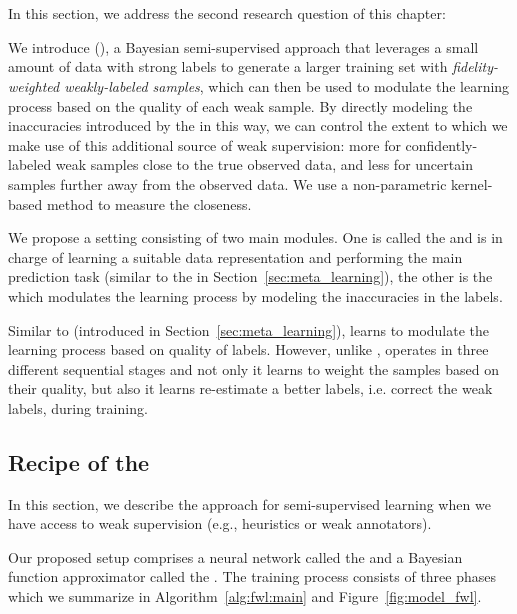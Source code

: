 \newcommand{\tfunc}{T} %
\section{\fwlfull}
\label{sec:fidelity_weighted_learning}

In this section, we address the second research question of this chapter:

We introduce \fwlfull (\fwl), a Bayesian semi-supervised approach that leverages a small amount of data with strong labels to generate a larger training set with \emph{fidelity-weighted weakly-labeled samples}, which can then be used to modulate the learning process based on the quality of each weak sample. By directly modeling the inaccuracies introduced by the \wa in this way, we can control the extent to which we make use of this additional source of weak supervision: more for confidently-labeled weak samples close to the true observed data, and less for uncertain samples further away from the observed data. We use a non-parametric kernel-based method to measure the closeness.

We propose a setting consisting of two main modules. One is called the \std and is in charge of learning a suitable data representation and performing the main prediction task (similar to the \tnet in Section~\ref{sec:meta_learning}), the other is the \tch which modulates the learning process by modeling the inaccuracies in the labels. 

Similar to \cws (introduced in Section~\ref{sec:meta_learning}), \fwl learns to modulate the learning process based on quality of labels. However, unlike \cws, \fwl operates in three different sequential stages and not only it learns to weight the samples based on their quality, but also it learns re-estimate a better labels, i.e. correct the weak labels, during training. 


\subsection{Recipe of the \fwlfull}
\label{sec:proposed-method}
In this section, we describe the \fwl approach for semi-supervised learning when we have access to weak supervision (e.g., heuristics or weak annotators). 

Our proposed setup comprises a neural network called the \textbf{\std} and a Bayesian function approximator called the \textbf{\tch}. The training process consists of three phases which we summarize in Algorithm~\ref{alg:fwl:main} and Figure~\ref{fig:model_fwl}.

